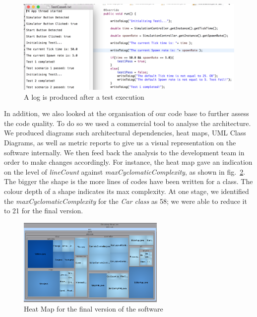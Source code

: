 \begin{figure}[h]
	\begin{center}
		\includegraphics[width=\textwidth]{img/testCase.png}
		\caption{A log is produced after a test execution}
	\label{fig:testCase}
	\end{center}
\end{figure}

In addition, we also looked at the organisation of our code base to further assess the code quality.  To do so we used a commercial tool to analyse the architecture. We produced diagrams such architectural dependencies, heat maps, UML Class Diagrams, as well as metric reports to give us a visual representation on the software internally. We then feed back the analysis to the development team in order to make changes accordingly. For instance, the heat map gave an indication on the level of \textit{lineCount} against \textit{maxCyclomaticComplexity}, as shown in fig.~\ref{fig:heatmap}. The bigger the shape is the more lines of codes have been written for a class. The colour depth of a shape indicates its max complexity. At one stage, we identified the \textit{maxCyclomaticComplexity} for the \textit{Car class} as 58; we were able to reduce it to 21 for the final version.     

\begin{figure}[h]
	\begin{minipage}{\textwidth}
		\begin{center}
				\includegraphics[width=71mm,keepaspectratio ]{img/heatmap.png}
			\caption{Heat Map for the final version of the software}
			\label{fig:heatmap}	
		\end{center}
	\end{minipage}
\end{figure}

